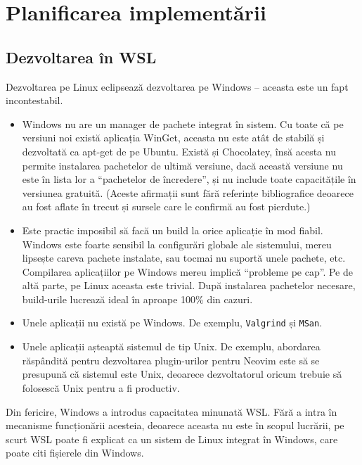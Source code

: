 \documentclass[a4paper,12pt]{report}
\begin{document}
\section{Planificarea implementării}

\subsection{Dezvoltarea în \acs{WSL}}

Dezvoltarea pe Linux eclipsează dezvoltarea pe Windows -- aceasta este un fapt incontestabil.
\begin{itemize}
    \item 
        Windows nu are un manager de pachete integrat în sistem.
        Cu toate că pe versiuni noi există aplicația WinGet, 
        aceasta nu este atât de stabilă și dezvoltată ca apt-get de pe Ubuntu.
        Există și Chocolatey, însă acesta nu permite instalarea pachetelor de ultimă versiune,
        dacă această versiune nu este în lista lor a ``pachetelor de încredere'',
        și nu include toate capacitățile în versiunea gratuită.
        (Aceste afirmații sunt fără referințe bibliografice deoarece 
        au fost aflate în trecut și sursele care le confirmă au fost pierdute.)

    \item
        Este practic imposibil să facă un build la orice aplicație în mod fiabil.
        Windows este foarte sensibil la configurări globale ale sistemului,
        mereu lipsește careva pachete instalate, sau tocmai nu suportă unele pachete, etc.
        Compilarea aplicațiilor pe Windows mereu implică ``probleme pe cap''.
        Pe de altă parte, pe Linux aceasta este trivial.
        După instalarea pachetelor necesare, build-urile lucrează ideal în aproape 100\% din cazuri.

    \item
        Unele aplicații nu există pe Windows.
        De exemplu, \texttt{Valgrind} și \texttt{MSan}.

    \item
        Unele aplicații așteaptă sistemul de tip Unix.
        De exemplu, abordarea răspândită pentru dezvoltarea plugin-urilor
        pentru Neovim este să se presupună că sistemul este Unix,
        deoarece dezvoltatorul oricum trebuie să folosescă Unix pentru a fi productiv.
\end{itemize}

Din fericire, Windows a introdus capacitatea minunată \ac{WSL}\cite{wsl}.
Fără a intra în mecanisme funcționării acesteia, deoarece aceasta nu este în scopul lucrării,
pe scurt \ac{WSL} poate fi explicat ca un sistem de Linux integrat în Windows, care poate citi fișierele din Windows.
\end{document}
